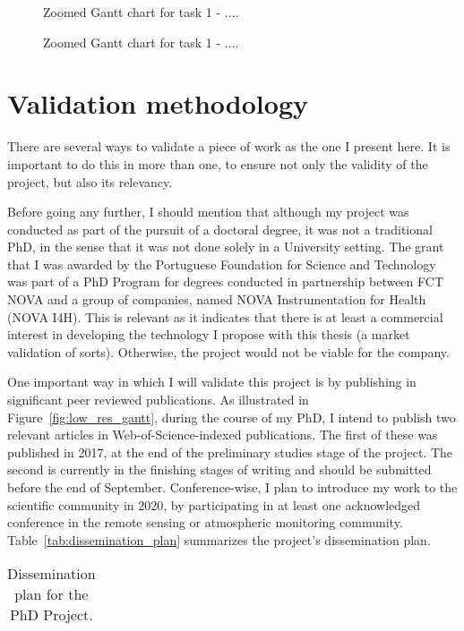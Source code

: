 \begin{figure}[htpb]
    \centering
    \missingfigure{}
    \caption{Zoomed Gantt chart for task 1 - ....}
    \label{fig:task3}
\end{figure}

\begin{figure}[htpb]
    \centering
    \missingfigure{}
    \caption{Zoomed Gantt chart for task 1 - ....}
    \label{fig:task4}
\end{figure}

\section{Validation methodology}%
\label{sec:validation_methodology}

There are several ways to validate a piece of work as the one I present
here. It is important to do this in more than one, to ensure not only
the validity of the project, but also its relevancy.

Before going any further, I should mention that although my project was
conducted as part of the pursuit of a doctoral degree, it was not a
traditional PhD, in the sense that it was not done solely in a
University setting. The grant that I was awarded by the Portuguese
Foundation for Science and Technology was part of a PhD Program for
degrees conducted in partnership between FCT NOVA and a group of
companies, named NOVA Instrumentation for Health (NOVA I4H). This is
relevant as it indicates that there is at least a commercial interest in
developing the technology I propose with this thesis (a market
validation of sorts). Otherwise, the project would not be viable for the
company.

One important way in which I will validate this project is by publishing
in significant peer reviewed publications. As illustrated in
Figure~\ref{fig:low_res_gantt}, during the course of my PhD, I intend to
publish two relevant articles in Web-of-Science-indexed publications.
The first of these was published in 2017, at the end of the preliminary
studies stage of the project. The second is currently in the finishing
stages of writing and should be submitted before the end of September.
Conference-wise, I plan to introduce my work to the scientific community
in 2020, by participating in at least one acknowledged conference in the
remote sensing or atmospheric monitoring community.
Table~\ref{tab:dissemination_plan} summarizes the project's
dissemination plan.

\begin{table}[htpb]
    \centering
    \caption{Dissemination plan for the PhD Project.}
    \label{tab:label}
    \begin{tabular}{c}
    
    \end{tabular}
\end{table}


